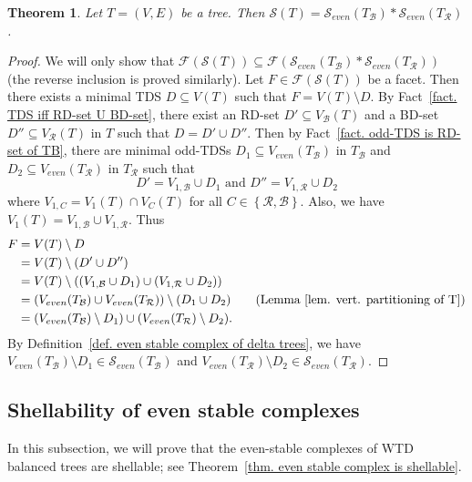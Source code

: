 \documentclass[12pt, reqno]{amsart}
\theoremstyle{definition}
\theoremstyle{plain}
\newtheorem{theorem}{Theorem}[subsection]
\theoremstyle{definition}
\newcommand{\R}{\mathcal{R}}
\newcommand{\B}{\mathcal{B}}
\newcommand\set[1]{\left\lbrace #1 \right\rbrace}
\newcommand{\calS}{\mathcal{S}}
\begin{document}
\begin{theorem}\label{thm. stable comp. is join of even complexes}
    Let $T = (V,E)$ be a tree.
    Then
    $\calS(T) = \calS_{even}(T_\B) * \calS_{even}(T_\R)$.
\end{theorem}

\begin{proof}
We will only show that $\mathcal{F}(\calS(T)) \subseteq \mathcal{F}(\calS_{even}(T_\B) * \calS_{even}(T_\R))$ (the reverse inclusion is proved similarly).
    Let $F \in \mathcal{F}(\calS(T))$ be a facet.
    Then there exists a minimal TDS $D \subseteq V(T)$ such that $F = V(T)\setminus D$.
    By Fact~\ref{fact. TDS iff RD-set U BD-set}, there exist an RD-set $D' \subseteq V_\B(T)$ and a BD-set $D'' \subseteq V_\R(T)$ in $T$ such that $D = D' \cup D''$.
    Then by Fact~\ref{fact. odd-TDS is RD-set of TB}, there are minimal odd-TDSs $D_1 \subseteq V_{even}(T_\B)$ in $T_\B$ and $D_2 \subseteq V_{even}(T_\R)$ in $T_\R$ such that
    $$
    D' = V_{1,\B} \cup D_1 \text{ and } D'' = V_{1,\R} \cup D_2
    $$
    where $V_{1,C} = V_1(T) \cap V_C(T)$ for all $C \in \set{\R,\B}$.
    Also, we have $V_1(T) = V_{1,\B} \cup V_{1,\R}$.
    Thus
    \begin{align*}
        F &= V(T)\setminus D\\
        &= V(T)\setminus (D' \cup D'')\\
        &= V(T) \setminus \left((V_{1,\B} \cup D_1) \cup (V_{1,\R} \cup D_2) \right)\\
        &= \left(V_{even}(T_\B) \cup V_{even}(T_\R) \right)\setminus (D_1 \cup D_2) \tag{Lemma~\ref{lem. vert. partitioning of T}}\\
        &= (V_{even}(T_\B)\setminus D_1) \cup (V_{even}(T_\R)\setminus D_2).
    \end{align*}
    By Definition~\ref{def. even stable complex of delta trees}, we have $V_{even}(T_\B)\setminus D_1 \in \calS_{even}(T_\B)$ and $V_{even}(T_\R)\setminus D_2 \in \calS_{even}(T_\R)$. 
\end{proof}

\subsection{Shellability of even stable complexes}\label{subsec. Shellability of even stable complexes}

In this subsection, we will prove that the even-stable complexes of WTD balanced trees are shellable; see Theorem~\ref{thm. even stable complex is shellable}.
\end{document}
